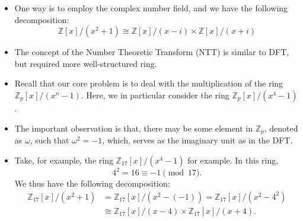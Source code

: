 \begin{frame}
    \begin{itemize}
        \item <1->One way is to employ the complex number field, 
            and we have the following decomposition:
            \[ \mathbb{Z}[x]/(x^2 + 1) \cong 
            \mathbb{Z}[x]/(x - i) \times 
            \mathbb{Z}[x]/(x + i) \]
        \item <2->The concept of the Number Theoretic Transform (NTT) is similar to DFT, 
            but required more well-structured ring.
        \item <3->Recall that our core problem is to deal with the multiplication of
            the ring \( \mathbb{Z}_{p}[x]/(x^{n}-1) \).
            Here, we in particular consider the ring \( \mathbb{Z}_{p}[x]/(x^{4}-1) \).
        \item <4->The important observation is that, there may be some element in \( \mathbb{Z}_{p}\),
            denoted as \(\omega\), such that \(\omega^{2} = -1\), which, serves as the imaginary unit
            as in the DFT.

        \item <5->Take, for example, the ring \( \mathbb{Z}_{17}[x]/(x^{4}-1)\) for example. 
            In this ring,
            \[
                4^{2} = 16 \equiv -1 \pmod{17}.
            \]
            We thus have the following decomposition:
            \begin{align*}
                \mathbb{Z}_{17}[x]/(x^{2}+1) 
                &= \mathbb{Z}_{17}[x] / (x^{2} - (-1))
                = \mathbb{Z}_{17}[x] / (x^{2} - 4^{2})\\
                &\cong 
                \mathbb{Z}_{17}[x]/(x-4) \times 
                \mathbb{Z}_{17}[x]/(x+4).
            \end{align*}

    \end{itemize}
\end{frame}




